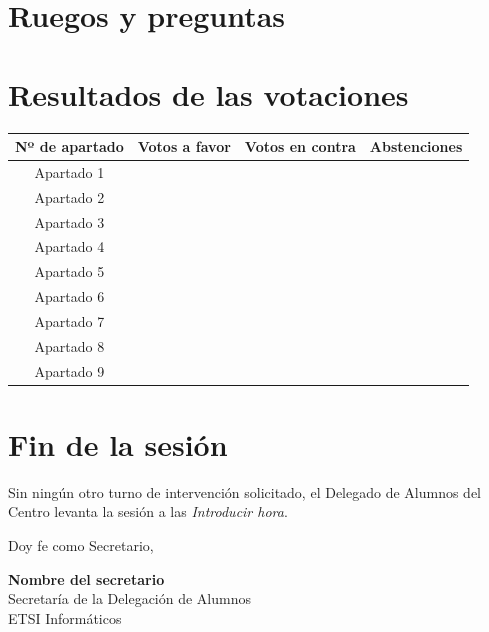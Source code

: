 \documentclass[12pt,spanish,a4paper]{article}
\begin{document}
    \section{}
      \lipsum[7]
    \newpage
    \section{}
      \lipsum[8]
    \newpage
    \section{Ruegos y preguntas}
      \lipsum[9]
    \newpage
    \section{Resultados de las votaciones}
      \begin{center}
        \begin{tabular}{|c||c|c|c|}
          \hline
          Nº de apartado & Votos a favor & Votos en contra & Abstenciones \\
          \hline \hline
          Apartado 1 & & & \\
          \hline
          Apartado 2 & & & \\
          \hline
          Apartado 3 & & & \\
          \hline
          Apartado 4 & & & \\
          \hline
          Apartado 5 & & & \\
          \hline
          Apartado 6 & & & \\
          \hline
          Apartado 7 & & & \\
          \hline
          Apartado 8 & & & \\
          \hline
          Apartado 9 & & & \\
          \hline
        \end{tabular}
      \end{center}
    \section{Fin de la sesión}  
      Sin ningún otro turno de intervención solicitado, el Delegado de Alumnos del Centro levanta
      la sesión a las \textit{Introducir hora}.\par
      Doy fe como Secretario,

      \quad

      \quad

      \quad

      \begin{center}
        \textbf{Nombre del secretario}\\
        Secretaría de la Delegación de Alumnos\\
        ETSI Informáticos 
      \end{center}
\end{document}
